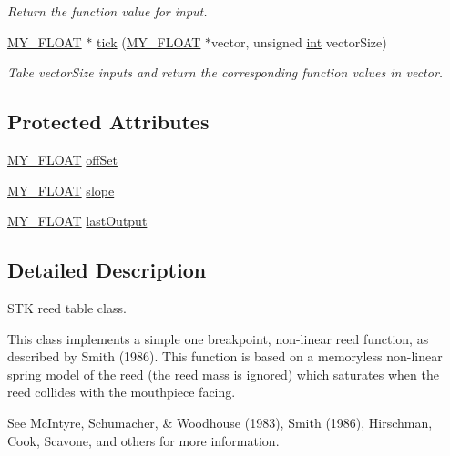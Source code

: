 \begin{DoxyCompactItemize}
\begin{DoxyCompactList}\small\item\em Return the function value for {\itshape input}. \end{DoxyCompactList}\item 
\hyperlink{globals_8h_a0c8f91794b1a999fdd02c8d630184662}{M\+Y\+\_\+\+F\+L\+O\+AT} $\ast$ \hyperlink{class_reed_tabl_aa5ff68ef761d7d6cc0468011484bbf08}{tick} (\hyperlink{globals_8h_a0c8f91794b1a999fdd02c8d630184662}{M\+Y\+\_\+\+F\+L\+O\+AT} $\ast$vector, unsigned \hyperlink{xmltok_8h_a5a0d4a5641ce434f1d23533f2b2e6653}{int} vector\+Size)
\begin{DoxyCompactList}\small\item\em Take {\itshape vector\+Size} inputs and return the corresponding function values in {\itshape vector}. \end{DoxyCompactList}\end{DoxyCompactItemize}
\subsection*{Protected Attributes}
\begin{DoxyCompactItemize}
\item 
\hyperlink{globals_8h_a0c8f91794b1a999fdd02c8d630184662}{M\+Y\+\_\+\+F\+L\+O\+AT} \hyperlink{class_reed_tabl_ad018e3b63358533ab9e0b8c601970390}{off\+Set}
\item 
\hyperlink{globals_8h_a0c8f91794b1a999fdd02c8d630184662}{M\+Y\+\_\+\+F\+L\+O\+AT} \hyperlink{class_reed_tabl_a4db040d7d8bc677e43e27cc1260422d1}{slope}
\item 
\hyperlink{globals_8h_a0c8f91794b1a999fdd02c8d630184662}{M\+Y\+\_\+\+F\+L\+O\+AT} \hyperlink{class_reed_tabl_a2fca6697bed8ad35d73b0853fb156df7}{last\+Output}
\end{DoxyCompactItemize}


\subsection{Detailed Description}
S\+TK reed table class. 

This class implements a simple one breakpoint, non-\/linear reed function, as described by Smith (1986). This function is based on a memoryless non-\/linear spring model of the reed (the reed mass is ignored) which saturates when the reed collides with the mouthpiece facing.

See Mc\+Intyre, Schumacher, \& Woodhouse (1983), Smith (1986), Hirschman, Cook, Scavone, and others for more information.


